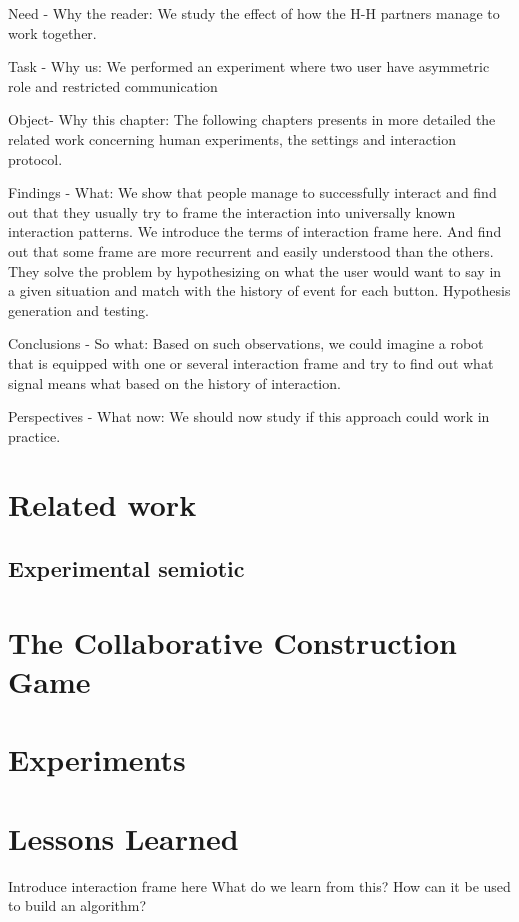 Need - Why the reader: We study the effect of how the H-H partners manage to work together.

Task - Why us: We performed an experiment where two user have asymmetric role and restricted communication

Object- Why this chapter: The following chapters presents in more detailed the related work concerning human experiments, the settings and interaction protocol.

Findings - What: We show that people manage to successfully interact and find out that they usually try to frame the interaction into universally known interaction patterns. We introduce the terms of interaction frame here. And find out that some frame are more recurrent and easily understood than the others. They solve the problem by hypothesizing on what the user would want to say in a given situation and match with the history of event for each button. Hypothesis generation and testing.

Conclusions - So what: Based on such observations, we could imagine a robot that is equipped with one or several interaction frame and try to find out what signal means what based on the history of interaction.

Perspectives - What now: We should now study if this approach could work in practice.

\section{Related work}

\subsection{Experimental semiotic}

\section{The Collaborative Construction Game}

\section{Experiments}

\section{Lessons Learned} %

Introduce interaction frame here
What do we learn from this? 
How can it be used to build an algorithm?

